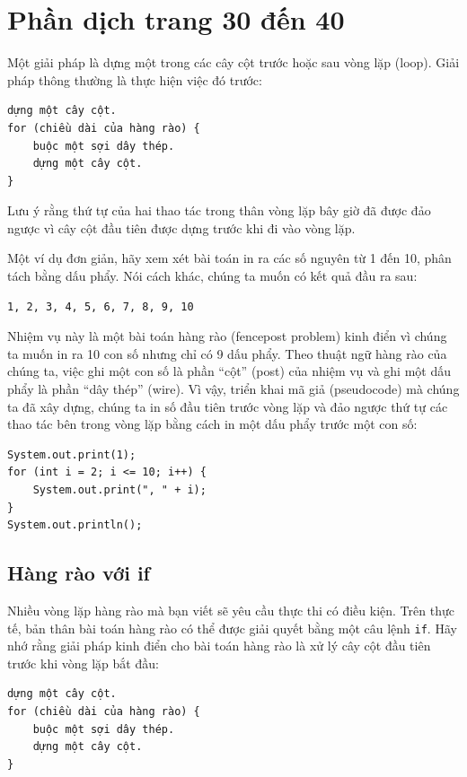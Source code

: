 \section{Phần dịch trang 30 đến 40}
Một giải pháp là dựng một trong các cây cột trước hoặc sau vòng lặp (loop). Giải pháp thông thường là thực hiện việc đó trước:

\begin{verbatim}
dựng một cây cột.
for (chiều dài của hàng rào) {
    buộc một sợi dây thép.
    dựng một cây cột.
}
\end{verbatim}


Lưu ý rằng thứ tự của hai thao tác trong thân vòng lặp bây giờ đã được đảo ngược vì cây cột đầu tiên được dựng trước khi đi vào vòng lặp.

Một ví dụ đơn giản, hãy xem xét bài toán in ra các số nguyên từ 1 đến 10, phân tách bằng dấu phẩy. Nói cách khác, chúng ta muốn có kết quả đầu ra sau:
 
\begin{verbatim}
1, 2, 3, 4, 5, 6, 7, 8, 9, 10 
\end{verbatim}


Nhiệm vụ này là một bài toán hàng rào (fencepost problem) kinh điển vì chúng ta muốn in ra 10 con số nhưng chỉ có 9 dấu phẩy. Theo thuật ngữ hàng rào của chúng ta, việc ghi một con số là phần ``cột'' (post) của nhiệm vụ và ghi một dấu phẩy là phần ``dây thép'' (wire). Vì vậy, triển khai mã giả (pseudocode) mà chúng ta đã xây dựng, chúng ta in số đầu tiên trước vòng lặp và đảo ngược thứ tự các thao tác bên trong vòng lặp bằng cách in một dấu phẩy trước một con số:

\begin{verbatim}
System.out.print(1);
for (int i = 2; i <= 10; i++) {
    System.out.print(", " + i);
}
System.out.println();
\end{verbatim}


\subsection*{Hàng rào với if}

Nhiều vòng lặp hàng rào mà bạn viết sẽ yêu cầu thực thi có điều kiện. Trên thực tế, bản thân bài toán hàng rào có thể được giải quyết bằng một câu lệnh \texttt{if}. Hãy nhớ rằng giải pháp kinh điển cho bài toán hàng rào là xử lý cây cột đầu tiên trước khi vòng lặp bắt đầu:

\begin{verbatim}
dựng một cây cột.
for (chiều dài của hàng rào) {
    buộc một sợi dây thép.
    dựng một cây cột.
}
\end{verbatim}


